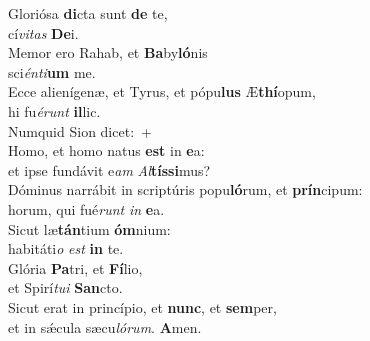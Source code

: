 \evenverse Gloriósa \textbf{di}cta sunt \textbf{de} te,~\*\\
\evenverse cí\textit{vi}\textit{tas} \textbf{De}i.\\
\oddverse Memor ero Rahab, et \textbf{Ba}by\textbf{ló}nis~\*\\
\oddverse sci\textit{én}\textit{ti}\textbf{um} me.\\
\evenverse Ecce alienígenæ, et Tyrus, et pópu\textbf{lus} Æ\textbf{thí}opum,~\*\\
\evenverse hi fu\textit{é}\textit{runt} \textbf{il}lic.\\
\oddverse Numquid Sion dicet:~+\\
\oddverse  Homo, et homo natus \textbf{est} in \textbf{e}a:~\*\\
\oddverse et ipse fundávit e\textit{am} \textit{Al}\textbf{tís}\textbf{si}mus?\\
\evenverse Dóminus narrábit in scriptúris popu\textbf{ló}rum, et \textbf{prín}cipum:~\*\\
\evenverse horum, qui fué\textit{runt} \textit{in} \textbf{e}a.\\
\oddverse Sicut læ\textbf{tán}tium \textbf{óm}nium:~\*\\
\oddverse habitáti\textit{o} \textit{est} \textbf{in} te.\\
\evenverse Glória \textbf{Pa}tri, et \textbf{Fí}lio,~\*\\
\evenverse et Spirí\textit{tu}\textit{i} \textbf{San}cto.\\
\oddverse Sicut erat in princípio, et \textbf{nunc}, et \textbf{sem}per,~\*\\
\oddverse et in sǽcula sæcu\textit{ló}\textit{rum}. \textbf{A}men.\\
